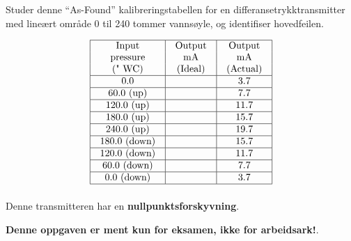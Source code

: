 

Studer denne ``As-Found'' kalibreringstabellen for en differansetrykktransmitter med lineært område 0 til 240 tommer vannsøyle, og identifiser hovedfeilen.


$$\vbox{\offinterlineskip
\halign{\strut
\vrule \quad\hfil # \ \hfil & 
\vrule \quad\hfil # \ \hfil & 
\vrule \quad\hfil # \ \hfil \vrule \cr
\noalign{\hrule}
%
Input & Output & Output \cr
%
pressure & mA & mA \cr
%
(" WC) & (Ideal) & (Actual) \cr
%
\noalign{\hrule}
%
0.0 & & 3.7 \cr
%
\noalign{\hrule}
%
60.0 (up) & & 7.7 \cr
%
\noalign{\hrule}
%
120.0 (up) & & 11.7 \cr
%
\noalign{\hrule}
%
180.0 (up) & & 15.7 \cr
%
\noalign{\hrule}
%
240.0 (up) & & 19.7 \cr
%
\noalign{\hrule}
%
180.0 (down) & & 15.7 \cr
%
\noalign{\hrule}
%
120.0 (down) & & 11.7 \cr
%
\noalign{\hrule}
%
60.0 (down) & & 7.7 \cr
%
\noalign{\hrule}
%
0.0 (down) & & 3.7 \cr
%
\noalign{\hrule}
} %
}$$ %







Denne transmitteren har en {\bf nullpunktsforskyvning}.







{\bf Denne oppgaven er ment kun for eksamen, ikke for arbeidsark!}.



